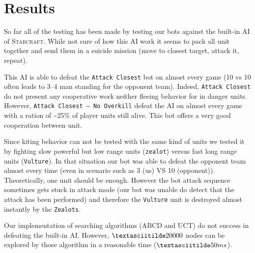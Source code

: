\section{Results}




So far all of the testing has been made by testing our bots against the built-in AI of \textsc{Starcraft}. While not sure of how this AI work it seems to pack all unit together and send them in a suicide mission (move to closest target, attack it, repeat). 

This AI is able to defeat the \texttt{Attack Closest} bot on almost every game (10 vs 10 often leads to 3--4 man standing for the opponent team).
Indeed, \texttt{Attack Closest} do not present any cooperative work neither fleeing behavior for in danger units. However, \texttt{Attack Closest -- No Overkill} defeat the AI on almost every game with a ration of \textasciitilde25\% of player units still alive. This bot offers a very good cooperation between unit.

Since kiting behavior can not be tested with the same kind of units we tested it by fighting slow powerful but low range units (\texttt{zealot}) versus fast long range units (\texttt{Vulture}). 
In that situation our bot was able to defeat the opponent team almost every time (even in scenario such as 3 (us) VS 10 (opponent)). 
Theoretically, one unit should be enough. However the bot attack sequence sometimes gets stuck in attack mode (our bot was unable do detect that the attack has been performed) and therefore the \texttt{Vulture} unit is destroyed almost instantly by the \texttt{Zealots}.

Our implementation of searching algorithms (ABCD and UCT) do not success in defeating the built-in AI.
However, $\textasciitilde 20000$ nodes can be explored by those algorithm in a reasonable time ($\textasciitilde 50ms$). 
